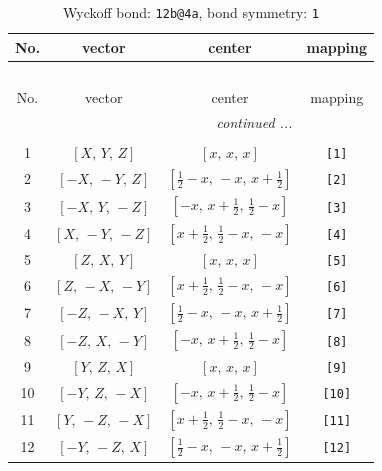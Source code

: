 \documentclass[fleqn,8pt]{jsarticle}
\begin{document}
\begin{longtable}{cccc}
\caption{Wyckoff bond: {\tt 12b@4a}, bond symmetry: {\tt 1}}
 \\
 \hline \hline
No. & vector & center & mapping \\ \hline \endfirsthead

\multicolumn{3}{l}{\tablename\ \thetable{}} \\
 \hline \hline
No. & vector & center & mapping \\ \hline \endhead

 \hline \hline
\multicolumn{3}{r}{\footnotesize\it continued ...} \\ \endfoot

 \hline \hline
\multicolumn{3}{r}{} \\ \endlastfoot

1 & $\left[ X,\, Y,\, Z \right]$ & $\left[ x,\, x,\, x \right]$ & {\tt [1]} \\ \hline
2 & $\left[ - X,\, - Y,\, Z \right]$ & $\left[ \frac{1}{2} - x,\, - x,\, x + \frac{1}{2} \right]$ & {\tt [2]} \\ \hline
3 & $\left[ - X,\, Y,\, - Z \right]$ & $\left[ - x,\, x + \frac{1}{2},\, \frac{1}{2} - x \right]$ & {\tt [3]} \\ \hline
4 & $\left[ X,\, - Y,\, - Z \right]$ & $\left[ x + \frac{1}{2},\, \frac{1}{2} - x,\, - x \right]$ & {\tt [4]} \\ \hline
5 & $\left[ Z,\, X,\, Y \right]$ & $\left[ x,\, x,\, x \right]$ & {\tt [5]} \\ \hline
6 & $\left[ Z,\, - X,\, - Y \right]$ & $\left[ x + \frac{1}{2},\, \frac{1}{2} - x,\, - x \right]$ & {\tt [6]} \\ \hline
7 & $\left[ - Z,\, - X,\, Y \right]$ & $\left[ \frac{1}{2} - x,\, - x,\, x + \frac{1}{2} \right]$ & {\tt [7]} \\ \hline
8 & $\left[ - Z,\, X,\, - Y \right]$ & $\left[ - x,\, x + \frac{1}{2},\, \frac{1}{2} - x \right]$ & {\tt [8]} \\ \hline
9 & $\left[ Y,\, Z,\, X \right]$ & $\left[ x,\, x,\, x \right]$ & {\tt [9]} \\ \hline
10 & $\left[ - Y,\, Z,\, - X \right]$ & $\left[ - x,\, x + \frac{1}{2},\, \frac{1}{2} - x \right]$ & {\tt [10]} \\ \hline
11 & $\left[ Y,\, - Z,\, - X \right]$ & $\left[ x + \frac{1}{2},\, \frac{1}{2} - x,\, - x \right]$ & {\tt [11]} \\ \hline
12 & $\left[ - Y,\, - Z,\, X \right]$ & $\left[ \frac{1}{2} - x,\, - x,\, x + \frac{1}{2} \right]$ & {\tt [12]} \\
\end{longtable}
\end{document}
